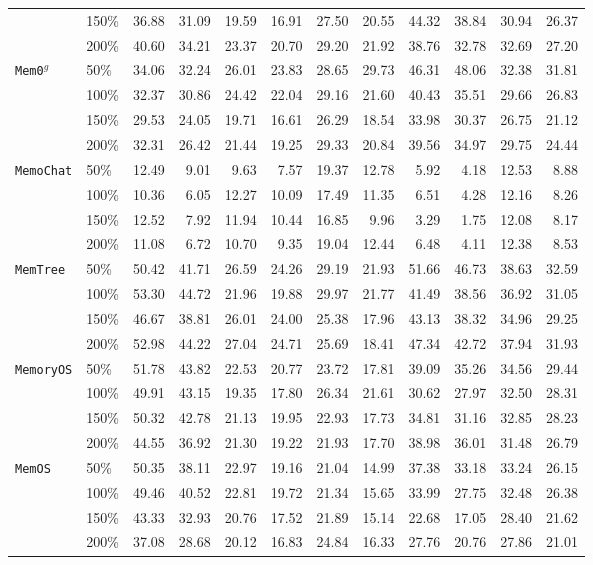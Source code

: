 \begin{table}[]
\begin{tabular}{l|l|r|r|r|r|r|r|r|r|r|r}
& 150\% & 36.88 & 31.09 & 19.59 & 16.91 & 27.50 & 20.55 & 44.32 & 38.84 & 30.94 & 26.37 \\
& 200\% & 40.60 & 34.21 & 23.37 & 20.70 & 29.20 & 21.92 & 38.76 & 32.78 & 32.69 & 27.20 \\
\midrule
\multirow{4}{*}{\tt Mem0$^g$} & 50\% & 34.06 & 32.24 & 26.01 & 23.83 & 28.65 & 29.73 & 46.31 & 48.06 & 32.38 & 31.81 \\
& 100\% & 32.37 & 30.86 & 24.42 & 22.04 & 29.16 & 21.60 & 40.43 & 35.51 & 29.66 & 26.83 \\
& 150\% & 29.53 & 24.05 & 19.71 & 16.61 & 26.29 & 18.54 & 33.98 & 30.37 & 26.75 & 21.12 \\
& 200\% & 32.31 & 26.42 & 21.44 & 19.25 & 29.33 & 20.84 & 39.56 & 34.97 & 29.75 & 24.44 \\
\midrule
\multirow{4}{*}{\tt MemoChat} & 50\% & 12.49 & 9.01 & 9.63 & 7.57 & 19.37 & 12.78 & 5.92 & 4.18 & 12.53 & 8.88 \\
& 100\% & 10.36 & 6.05 & 12.27 & 10.09 & 17.49 & 11.35 & 6.51 & 4.28 & 12.16 & 8.26 \\
& 150\% & 12.52 & 7.92 & 11.94 & 10.44 & 16.85 & 9.96 & 3.29 & 1.75 & 12.08 & 8.17 \\ 
& 200\% & 11.08 & 6.72 & 10.70 & 9.35 & 19.04 & 12.44 & 6.48 & 4.11 & 12.38 & 8.53 \\
\midrule
\multirow{4}{*}{\tt MemTree} & 50\% & 50.42 & 41.71 & 26.59 & 24.26 & 29.19 & 21.93 & 51.66 & 46.73 & 38.63 & 32.59 \\
& 100\% & 53.30 & 44.72 & 21.96 & 19.88 & 29.97 & 21.77 & 41.49 & 38.56 & 36.92 & 31.05 \\
& 150\% & 46.67 & 38.81 & 26.01 & 24.00 & 25.38 & 17.96 & 43.13 & 38.32 & 34.96 & 29.25 \\ 
& 200\% & 52.98 & 44.22 & 27.04 & 24.71 & 25.69 & 18.41 & 47.34 & 42.72 & 37.94 & 31.93 \\
\midrule
\multirow{4}{*}{\tt MemoryOS} & 50\% & 51.78 & 43.82 & 22.53 & 20.77 & 23.72 & 17.81 & 39.09 & 35.26 & 34.56 & 29.44 \\
& 100\% & 49.91 & 43.15 & 19.35 & 17.80 & 26.34 & 21.61 & 30.62 & 27.97 & 32.50 & 28.31 \\
& 150\% & 50.32 & 42.78 & 21.13 & 19.95 & 22.93 & 17.73 & 34.81 & 31.16 & 32.85 & 28.23 \\ 
& 200\% & 44.55 & 36.92 & 21.30 & 19.22 & 21.93 & 17.70 & 38.98 & 36.01 & 31.48 & 26.79 \\
\midrule
\multirow{4}{*}{\tt MemOS} & 50\% & 50.35 & 38.11 & 22.97 & 19.16 & 21.04 & 14.99 & 37.38 & 33.18 & 33.24 & 26.15 \\
& 100\% & 49.46 & 40.52 & 22.81 & 19.72 & 21.34 & 15.65 & 33.99 & 27.75 & 32.48 & 26.38 \\
& 150\% & 43.33 & 32.93 & 20.76 & 17.52 & 21.89 & 15.14 & 22.68 & 17.05 & 28.40 & 21.62 \\
& 200\% & 37.08 & 28.68 & 20.12 & 16.83 & 24.84 & 16.33 & 27.76 & 20.76 & 27.86 & 21.01 \\
\bottomrule
\end{tabular}
\label{tab:lmescale}
\end{table}





